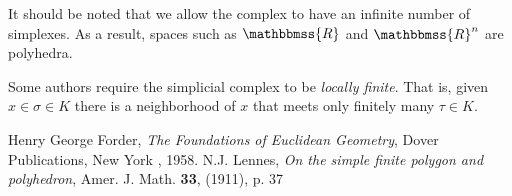 \documentclass{article}
\newcommand{\mathbb}[1]{\mathbbmss{#1}}
\begin{document}
It should be noted that we allow the complex to have an infinite number of
simplexes. As a result, spaces such as $\mathbb{R}$ and
${\mathbb{R}}^n$ are polyhedra.

Some authors require the simplicial complex to be \emph{locally finite}.
That is, given $x \in \sigma \in K$ there is a neighborhood of $x$ that meets only finitely many $\tau \in K$.

\begin{thebibliography}{99}
Henry George Forder, \emph{The Foundations of Euclidean Geometry}, Dover Publications, New York , 1958.
 N.J. Lennes, \emph{On the simple finite polygon and polyhedron}, Amer. J. Math. \textbf{33}, (1911), p. 37
\end{thebibliography}
\end{document}
